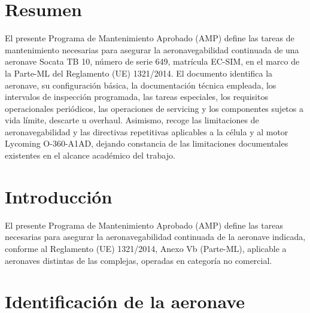\documentclass[12pt]{article}
\begin{document}

\clearpage
\thispagestyle{empty}
\section*{Resumen}

El presente Programa de Mantenimiento Aprobado (AMP) define las tareas de mantenimiento necesarias para asegurar la aeronavegabilidad continuada de una aeronave Socata TB 10, número de serie 649, matrícula EC-SIM, en el marco de la Parte-ML del Reglamento (UE) 1321/2014. El documento identifica la aeronave, su configuración básica, la documentación técnica empleada, los intervalos de inspección programada, las tareas especiales, los requisitos operacionales periódicos, las operaciones de servicing y los componentes sujetos a vida límite, descarte u overhaul. Asimismo, recoge las limitaciones de aeronavegabilidad y las directivas repetitivas aplicables a la célula y al motor Lycoming O-360-A1AD, dejando constancia de las limitaciones documentales existentes en el alcance académico del trabajo.


\clearpage
\hypersetup{linkcolor=black}
\tableofcontents\thispagestyle{empty}
\hypersetup{allcolors=blue}


\section{Introducción}
\label{sec:introduccion}

El presente Programa de Mantenimiento Aprobado (AMP) define las tareas necesarias para asegurar la aeronavegabilidad continuada de la aeronave indicada, conforme al Reglamento (UE) 1321/2014, Anexo Vb (Parte-ML), aplicable a aeronaves distintas de las complejas, operadas en categoría no comercial.

\section{Identificación de la aeronave}
\label{sec:identificacion}
\end{document}

